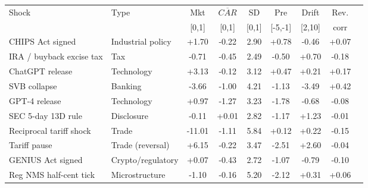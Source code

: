 \begin{tabular}{llccccccc}
\toprule
Shock & Type & Mkt & \multicolumn{1}{c}{$\overline{CAR}$} & SD & Pre & Drift & Rev. \\
 & & {\scriptsize[0,1]} & {\scriptsize[0,1]} & {\scriptsize[0,1]} & {\scriptsize[-5,-1]} & {\scriptsize[2,10]} & {\scriptsize corr} \\
\midrule
CHIPS Act signed & Industrial policy & +1.70 & -0.22 & 2.90 & +0.78 & -0.46 & +0.07 \\
IRA / buyback excise tax & Tax & -0.71 & -0.45 & 2.49 & -0.50 & +0.70 & -0.18 \\
ChatGPT release & Technology & +3.13 & -0.12 & 3.12 & +0.47 & +0.21 & +0.17 \\
SVB collapse & Banking & -3.66 & -1.00 & 4.21 & -1.13 & -3.49 & +0.42 \\
GPT-4 release & Technology & +0.97 & -1.27 & 3.23 & -1.78 & -0.68 & -0.08 \\
SEC 5-day 13D rule & Disclosure & -0.11 & +0.01 & 2.82 & -1.17 & +1.23 & -0.01 \\
Reciprocal tariff shock & Trade & -11.01 & -1.11 & 5.84 & +0.12 & +0.22 & -0.15 \\
Tariff pause & Trade (reversal) & +6.15 & -0.22 & 3.47 & -2.51 & +2.60 & -0.04 \\
GENIUS Act signed & Crypto/regulatory & +0.07 & -0.43 & 2.72 & -1.07 & -0.79 & -0.10 \\
Reg NMS half-cent tick & Microstructure & -1.10 & -0.16 & 5.20 & -2.12 & +0.31 & +0.06 \\
\bottomrule
\end{tabular}
